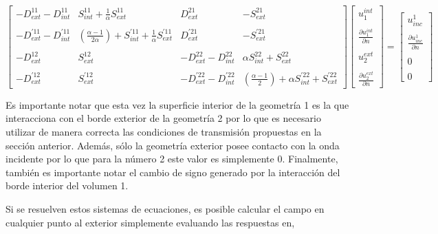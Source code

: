 \documentclass[12pt,letterpaper]{article}
\numberwithin{equation}{section}
\begin{document}
\begin{equation} 
\begin{bmatrix}
-D_{ext}^{11} - D_{int}^{11} & S_{int}^{11} + \frac{1}{\alpha}S_{ext}^{11} & D_{ext}^{21} & -S_{ext}^{21} \\
\\
-D_{ext}^{'11} - D_{int}^{'11} & (\frac{\alpha - 1}{2\alpha})+ S_{int}^{'11} + \frac{1}{\alpha}S_{ext}^{'11} & D_{ext}^{'21} & -S_{ext}^{'21}\\
\\
-D_{ext}^{12} & S_{ext}^{12} & -D_{ext}^{22} - D_{int}^{22} & \alpha S_{int}^{22} + S_{ext}^{22}\\
\\
-D_{ext}^{'12} & S_{ext}^{'12} & -D_{ext}^{'22} - D_{int}^{'22} & (\frac{\alpha - 1}{2})+\alpha S_{int}^{'22} + S_{ext}^{'22}
\end{bmatrix}
\begin{bmatrix}
u^{int}_1\\
\\
\frac{\partial u^{int}_1}{\partial n}\\
\\
u^{ext}_2\\
\\
\frac{\partial u^{ext}_2}{\partial n}
\end{bmatrix}
=
\begin{bmatrix}
u_{inc}^1\\
\\
\frac{\partial u_{inc}^1}{\partial n}\\
\\
0\\
\\
0
\end{bmatrix}
\label{eq:multi2_matriz int}		 
\end{equation} 

Es importante notar que esta vez la superficie interior de la geometría 1 es la que interacciona con el borde exterior de la geometría 2 por lo que es necesario utilizar de manera correcta las condiciones de transmisión propuestas en la sección anterior. Además, sólo la geometría exterior posee contacto con la onda incidente por lo que para la número 2 este valor es simplemente 0. Finalmente, también es importante notar el cambio de signo generado por la interacción del borde interior del volumen 1.

Si se resuelven estos sistemas de ecuaciones, es posible calcular el campo en cualquier punto al exterior simplemente evaluando las respuestas en,
\end{document}
